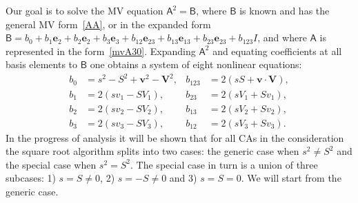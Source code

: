 \documentclass{birkjour}
\newcommand{\e}[1]{\mathbf{e}_{#1}} %
\def\A{\mathsf{A}}
\def\B{\mathsf{B}}
\def\e#1{\mathbf{e}_{#1}} %
\newcommand{\bv}{\ensuremath{\mathbf{v}}}
\newcommand{\bV}{\ensuremath{\mathbf{V}}}
\begin{document}
Our goal is to solve the MV equation $\A^2=\B$, where $\B$ is
known and has the general MV form~\eqref{AA}, or in the
expanded form $\B= b_0+b_1 \e{2}+b_2\e{2}+b_3\e{3}+
b_{12}\e{23}+b_{13}\e{13}+b_{23} \e{23}+b_{123} I$,  and where
$\A$ is represented in the form~\eqref{mvA30}. Expanding $\A^2$
and equating coefficients at all basis elements to $\B$ one
obtains  a system of eight nonlinear equations:
\begin{align}
b_0&=s^2-S^2+\bv^2-\bV^2, &b_{123}&=2(sS+\bv\cdot\bV)\label{MVM1Cl30}, \\
b_1&=2(s v_1-S V_1), &b_{23}&=2(s V_1+S v_1)\label{MVM2Cl30}, \\
b_2&=2(s v_2-S V_2), &b_{13}&=2(s V_2+S v_2)\label{MVM3Cl30}, \\
b_3&=2(s v_3-S V_3), &b_{12}&=2(s V_3+S v_3)\label{MVM4Cl30}.
\end{align}
In the progress of analysis it will be shown that for all CAs in
the consideration the square root algorithm splits into two cases:
the generic case when $s^2 \ne S^2$ and the special case when
$s^2=S^2$. The special case in turn is a union of three subcases:
1) $s = S\neq 0$,  2) $s = -S\neq 0$ and 3) $s=S=0$. We will start
from the generic case.
\end{document}
